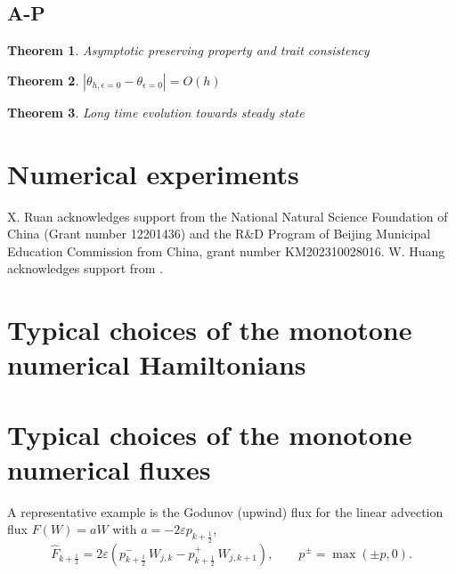 \documentclass[11pt, dina4, amsfont12]{article}
\newtheorem{theorem}{Theorem}[section]
\begin{document}
\subsection{A-P}

\begin{theorem}
    Asymptotic preserving property and trait consistency
\end{theorem}

\begin{theorem}
    $|\theta_{h,\epsilon=0}-\theta_{\epsilon=0}| = O(h)$ 
\end{theorem}

\begin{theorem}
    Long time evolution towards steady state
\end{theorem}


\section{Numerical experiments}


\bigskip
{}  
X. Ruan acknowledges support  from the National Natural Science Foundation of China (Grant number 12201436) and the R\&D Program of Beijing Municipal Education Commission from China, grant number KM202310028016.
W. Huang acknowledges support  from . 

\appendix
\section{Typical choices of the monotone numerical Hamiltonians} \label{append:HJ}

\section{Typical choices of the monotone numerical fluxes} \label{append:flux}
A representative example is the Godunov (upwind) flux for the linear advection
flux $F(W)=aW$ with $a=-2\varepsilon p_{k+\frac12}$,
\[
\widehat F_{k+\frac12}
=
2\varepsilon\!\left(
p_{k+\frac12}^-\, W_{j,k}
-
p_{k+\frac12}^+\, W_{j,k+1}
\right),
\qquad
p^\pm=\max(\pm p,0).
\]
\end{document}
